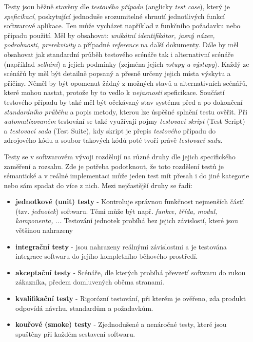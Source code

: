 \documentclass[czech, ma, kiv, he, iso690numb, pdf, viewonly]{fasthesis}
\begin{document}
    Testy jsou běžně stavěny dle \emph{testového případu} (anglicky \textit{test case}), který je \emph{speficikací}, poskytující jednoduše srozumitelné shrnutí jednotlivých funkcí softwarové aplikace. Ten může vycházet například z funkčního požadavku nebo případu použití. Měl by obsahovat: \textit{unikátní identifikátor, jasný název, podrobnosti, prerekvizity} a případné \textit{reference} na další dokumenty. Dále by měl obsahovat jak standardní průběh testového scénáře tak i alternativní scénáře (například \textit{selhání}) a jejich podmínky (zejména jejich \textit{vstupy a výstupy}). Každý ze scénářů by měl být detailně popsaný a přesně určeny jejich místa výskytu a příčiny. Něměl by být opomenut žádný z možných stavů a alternativních scénářů, které mohou nastat, protože by to vedlo k \emph{nejasnosti} speficikace. Součástí testového případu by také měl být očekávaný stav systému před a po dokončení \emph{standardního průběhu} a popis metody, kterou lze úspěšné splnění testu ověřit. \cite{brada2023usecase} Při \textit{automatizovaném} testování se také využívají pojmy \textit{testovací skript} (Test Script) a \textit{testovací sada} (Test Suite), kdy skript je přepis \textit{testového} případu do zdrojového kódu a soubor takových kódů poté tvoří právě \textit{testovací sadu}. \cite{brada2015crashcourse}

    Testy se v softwarovém vývoji rozdělují na různé druhy dle jejich specifického zaměření a rozsahu. Zde je potřeba podotknout, že toto rozdělení testů je sémantické a v reálné implementaci může jeden test mít přesah i do jiné kategorie nebo sám spadat do více z nich. Mezi nejčastější druhy se řadí:
    \begin{itemize}
        \item \textbf{jednotkové (unit) testy} - Kontroluje správnou funkčnost nejmenších částí (tzv. \textit{jednotek}) softwaru. Těmi může být např. \textit{funkce, třída, modul, komponenta, ...} Testování jednotek probíhá bez jejich závislostí, které jsou většinou nahrazeny 
        \item \textbf{integrační testy} -  jsou nahrazeny reálnými závislostmi a je testována integrace softwaru do jejího kompletního běhového prostředí. 
        \item \textbf{akceptační testy} - Scénáře, dle kterých probíhá převzetí softwaru do rukou zákazníka, předem domluvených oběma stranami.
        \item \textbf{kvalifikační testy} - Rigorózní testování, při kterém je ověřeno, zda produkt odpovídá návrhu, standardům a požadavkům. 
        \item \textbf{kouřové (smoke) testy} - Zjednodušené a nenáročné testy, které jsou spuštěny při každém sestavení softwaru.
    \end{itemize}
 
\end{document}
